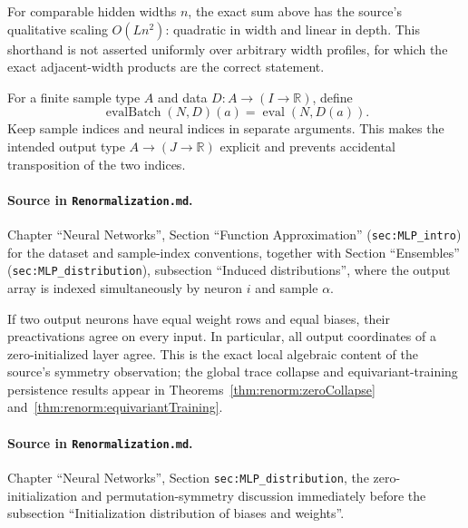 For comparable hidden widths $n$, the exact sum above has the source's qualitative scaling
$O(Ln^2)$: quadratic in width and linear in depth.  This shorthand is not asserted uniformly over
arbitrary width profiles, for which the exact adjacent-width products are the correct statement.

\begin{definition}
\label{def:renorm:evalBatch}
For a finite sample type $A$ and data $D:A\to(I\to\mathbb R)$, define
\[
  \operatorname{evalBatch}(N,D)(a)=\operatorname{eval}(N,D(a)).
\]
Keep sample indices and neural indices in separate arguments.  This makes the intended output type
$A\to(J\to\mathbb R)$ explicit and prevents accidental transposition of the two indices.

\paragraph{Source in \texttt{Renormalization.md}.}
Chapter ``Neural Networks'', Section ``Function Approximation'' (\texttt{sec:MLP\_intro}) for the
dataset and sample-index conventions, together with Section ``Ensembles''
(\texttt{sec:MLP\_distribution}), subsection ``Induced distributions'', where the output array is
indexed simultaneously by neuron $i$ and sample $\alpha$.
\end{definition}

\begin{lemma}
\label{lem:renorm:identicalNeurons}
If two output neurons have equal weight rows and equal biases, their preactivations agree on every
input.  In particular, all output coordinates of a zero-initialized layer agree.  This is the exact
local algebraic content of the source's symmetry observation; the global trace collapse and
equivariant-training persistence results appear in
Theorems~\ref{thm:renorm:zeroCollapse} and~\ref{thm:renorm:equivariantTraining}.

\paragraph{Source in \texttt{Renormalization.md}.}
Chapter ``Neural Networks'', Section \texttt{sec:MLP\_distribution}, the zero-initialization and
permutation-symmetry discussion immediately before the subsection ``Initialization distribution of
biases and weights''.
\end{lemma}

